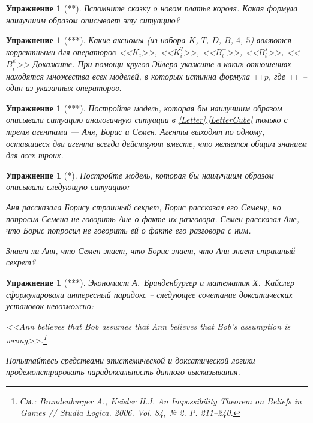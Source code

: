 \documentclass[11pt]{article}
\newtheorem{exercise}[theorem]{Упражнение}
\begin{document}
\begin{exercise}[**] Вспомните сказку о новом платье короля. Какая формула наилучшим образом описывает эту ситуацию?
\end{exercise}

\begin{exercise}[***] Какие аксиомы (из набора $K$, $T$, $D$, $B$, $4$, $5$) являются корректными для операторов <<$K_i$>>, <<$K_i^?$>>, <<$B^{+}_i$>>, <<$B^s_i$>>, <<$B^{\psi}_i$>>  Докажите. При помощи кругов Эйлера укажите в каких отношениях находятся множества всех моделей, в которых истинна формула $\Box p$, где $\Box$ – один из указанных операторов.   
\end{exercise}

\begin{exercise}[***] Постройте модель, которая бы наилучшим образом описывала ситуацию аналогичную ситуации в \ref{Letter}.\ref{LetterCube} только с тремя агентами — Аня, Борис и Семен. Агенты выходят по одному, оставшиеся два агента всегда действуют вместе, что является общим знанием для всех троих.	
\end{exercise}


\begin{exercise}[*] Постройте модель, которая бы наилучшим образом описывала следующую ситуацию:

\begin{center}
 Аня рассказала Борису страшный секрет, Борис рассказал его Семену, но попросил Семена не говорить Ане о факте их разговора. Семен рассказал Ане, что Борис попросил не говорить ей о факте его разговора с ним.	
\end{center}

	Знает ли Аня, что Семен знает, что Борис знает, что Аня знает страшный секрет?
\end{exercise}


\begin{exercise}[***] Экономист А.~Бранденбургер и математик Х.~Кайслер сформулировали интересный парадокс – следующее сочетание доксатических установок невозможно:
\begin{center}
	<<Ann believes that Bob assumes that Ann believes that Bob’s assumption is wrong>>.\footnote{См.: \textit{Brandenburger A., Keisler H.J.} An Impossibility Theorem on Beliefs in Games // Studia Logica. 2006. Vol. 84, № 2. P. 211–240.}	
\end{center}
Попытайтесь средствами эпистемической и доксатической логики продемонстрировать парадоксальность данного высказывания.
\end{exercise}
\end{document}
